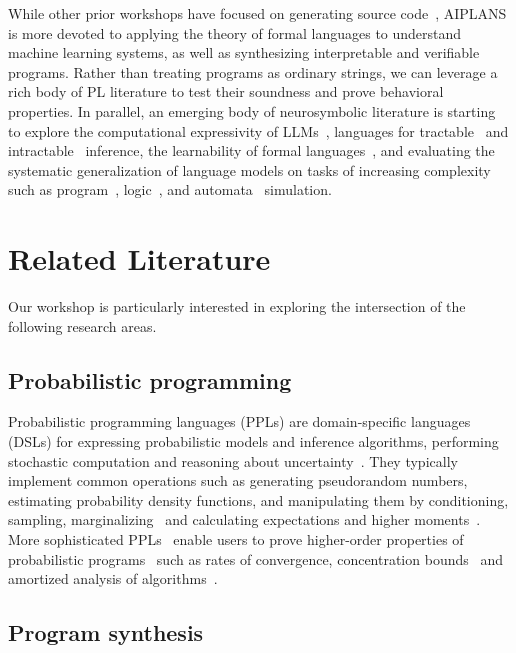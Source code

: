 \documentclass{article}
\begin{document}
While other prior workshops have focused on generating source code~\cite{scholak2023workshop, devanbu2024llm4code}, AIPLANS is more devoted to applying the theory of formal languages to understand machine learning systems, as well as synthesizing interpretable and verifiable programs. Rather than treating programs as ordinary strings, we can leverage a rich body of PL literature to test their soundness and prove behavioral properties. In parallel, an emerging body of neurosymbolic literature is starting to explore the computational expressivity of LLMs~\cite{strobl2024formal}, languages for tractable~\cite{choi2020probabilistic} and intractable~\cite{hu2023amortizing} inference, the learnability of formal languages~\cite{lan2024bridging}, and evaluating the systematic generalization of language models on tasks of increasing complexity such as program~\cite{giannou2023looped, friedman2024learning}, logic~\cite{yang2024counting}, and automata~\cite{liu2022transformers, rizvi2024simulating} simulation.

\section*{Related Literature}

Our workshop is particularly interested in exploring the intersection of the following research areas.

\subsection*{Probabilistic programming}

Probabilistic programming languages (PPLs) are domain-specific languages (DSLs) for expressing probabilistic models and inference algorithms, performing stochastic computation and reasoning about uncertainty~\cite{stan,pyro,gen,turing-ppl,monadbayes}. They typically implement common operations such as generating pseudorandom numbers, estimating probability density functions, and manipulating them by conditioning, sampling, marginalizing~\cite{liu2024scaling} and calculating expectations and higher moments~\cite{moosbrugger2022moment}. More sophisticated PPLs~\cite{chiang2023exact} enable users to prove higher-order properties of probabilistic programs~\cite{klinkenberg2024exact,zaiser2024exact} such as rates of convergence, concentration bounds~\cite{lobo2020programming} and amortized analysis of algorithms~\cite{batz2023calculus}.

\subsection*{Program synthesis}
\end{document}
